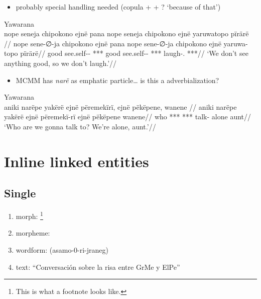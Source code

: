 \documentclass{memoir}
\begin{document}
\begin{itemize}
\tightlist
\item
  probably special handling needed (copula +  + ? `because of
  that')
\end{itemize}

\ex Yawarana \\
\label{convrisamaj-29}    \begingl
    \glpreamble  nope seneja chipokono ejnë pana nope seneja chipokono ejnë yaruwatopo pïrärë //
    \gla nope sene-∅-ja chipokono ejnë pana nope sene-∅-ja chipokono ejnë yaruwa-topo pïrärë//
    \glb good see.self-- ***   good see.self-- ***  laugh-. ***//
        \glft ‘We don’t see anything good, so we don’t laugh.’//  
    \endgl 
\xe

\begin{itemize}
\tightlist
\item
  MCMM has \emph{narë} as emphatic particle\ldots{} is this a
  adverbialization?
\end{itemize}

\ex Yawarana \\
\label{convrisamaj-47}    \begingl
    \glpreamble  aniki narëpe yakërë ejnë përemekïrï, ejnë pëkëpene, wanene //
    \gla aniki narëpe yakërë ejnë përemekï-rï ejnë pëkëpene wanene//
    \glb who *** ***  talk-  alone aunt//
        \glft ‘Who are we gonna talk to? We’re alone, aunt.’//  
    \endgl 
\xe

\section{Inline linked entities}

\subsection{Single}

\begin{enumerate}
\def\labelenumi{\arabic{enumi}.}
\tightlist
\item
  morph: \footnote{This is what a footnote looks like.}
\item
  morpheme: 
\item
  wordform: (asamo-0-ri-jraneg)
\item
  text: ``Conversación sobre la risa entre GrMe y ElPe''
\end{enumerate}
\end{document}
